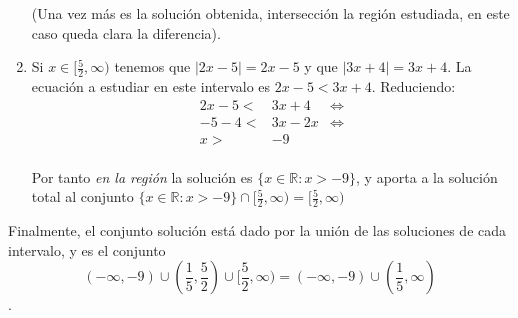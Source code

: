 \documentclass[10pt,a4paper]{article}
\begin{document}
\begin{enumerate}
  (Una vez más es la solución obtenida, intersección la región estudiada,
  en este caso queda clara la diferencia).
  

\item
  Si $x \in [\frac{5}{2},\infty)$ tenemos que $|2x-5| = 2x-5$ y que
  $|3x+4| = 3x+4$.
  La ecuación a estudiar en este intervalo es $ 2x-5 < 3x+4$.
  Reduciendo:
  \begin{align*}
    2x-5  <& 3x+4       & \iff \\
     -5 - 4 <& 3x - 2 x & \iff \\
     x >& -9 \\
  \end{align*}

  Por tanto \emph{en la región} la solución es
  $\{ x\in \mathbb{R} : x > -9 \}$, y aporta a la solución total al conjunto
  $\{ x\in \mathbb{R} : x > -9 \} \cap [\frac{5}{2},\infty)
    = [\frac{5}{2},\infty)$
  
\end{enumerate}

Finalmente, el conjunto solución está dado por la unión de las soluciones
de cada intervalo, y es el conjunto
$$(-\infty, -9) \cup (\frac{1}{5}, \frac{5}{2}) \cup [\frac{5}{2},\infty)
  = (-\infty, -9) \cup (\frac{1}{5}, \infty)$$.
\end{document}
